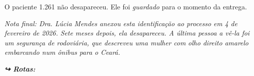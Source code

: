 \noindent O paciente 1.261 não desapareceu. Ele foi \textit{guardado} para o momento da entrega.

\noindent \textit{Nota final: Dra. Lúcia Mendes anexou esta identificação ao processo em 4 de fevereiro de 2026. Sete meses depois, ela desapareceu. A última pessoa a vê-la foi um segurança de rodoviária, que descreveu uma mulher com olho direito amarelo embarcando num ônibus para o Ceará.}

\vspace{0.5em}
\noindent\textit{\textbf{↪ Rotas:}  \rotasep {} \rotasep {}}
